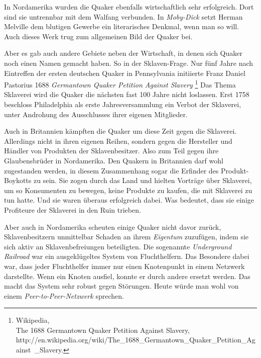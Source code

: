 \medskip

In Nordamerika wurden die Quaker ebenfalls wirtschaftlich sehr erfolgreich. Dort
sind sie untrennbar mit dem Walfang verbunden. In
\textit{Moby-Dick} setzt
Herman Melville dem blutigen Gewerbe ein
literarisches Denkmal, wenn man so
will. Auch dieses Werk trug zum allgemeinen Bild der Quaker bei.

\medskip

Aber es gab auch andere Gebiete neben der Wirtschaft, in denen sich Quaker noch
einen
Namen gemacht haben. So in der Sklaven-Frage. Nur fünf Jahre
nach Eintreffen
der ersten deutschen Quaker in Pennsylvania initiierte Franz Daniel Pastorius
1688 \textit{Germantown Quaker Petition Against Slavery}
\footnote{Wikipedia,
\\The 1688 Germantown Quaker Petition Against Slavery,
\\http://en.wikipedia.org/wiki/The\_1688\_Germantown\_Quaker\_Petition\_Against\
\_Slavery.} Das Thema Sklaverei wird die Quaker die nächsten fast 100 Jahre
nicht
loslassen. Erst 1758 beschloss Philadelphia als erste
Jahresversammlung ein Verbot der Sklaverei,
unter Androhung des Ausschlusses ihrer eigenen Mitglieder.

\medskip

Auch in Britannien kämpften die Quaker um diese Zeit gegen die Sklaverei.
Allerdings nicht in ihren eigenen Reihen, sondern gegen die Hersteller
und Händler von Produkten der Sklavenbesitzer. Also zum Teil gegen ihre
Glaubensbrüder in Nordamerika. Den Quakern in Britannien darf wohl zugestanden
werden, in diesem Zusammenhang sogar die Erfinder des Produkt-Boykotts
\index{Boykott} zu sein.
Sie zogen durch das Land und hielten Vorträge über Sklaverei, um so Konsumenten
zu
bewegen, keine Produkte zu kaufen, die mit Sklaverei zu tun hatte. Und sie
waren überaus erfolgreich dabei. Was bedeutet, dass sie einige Profiteure der
Sklaverei in den Ruin trieben.

\medskip

Aber auch in Nordamerika scheuten einige Quaker nicht
davor zurück,
Sklavenbesitzern unmittelbar Schaden an ihrem \textit{Eigentum} zuzufügen, indem
sie sich
aktiv an Sklavenbefreiungen beteiligten. Die sogenannte
\textit{Underground Railroad} war ein
ausgeklügeltes System von Fluchthelfern. Das
Besondere dabei war, dass jeder Fluchthelfer
immer
nur einen Knotenpunkt in einem
Netzwerk darstellte. Wenn ein Knoten ausfiel, konnte er durch andere ersetzt
werden. Das macht das System sehr robust gegen Störungen. Heute würde man
wohl
von einem \textit{Peer-to-Peer-Netzwerk} sprechen.


